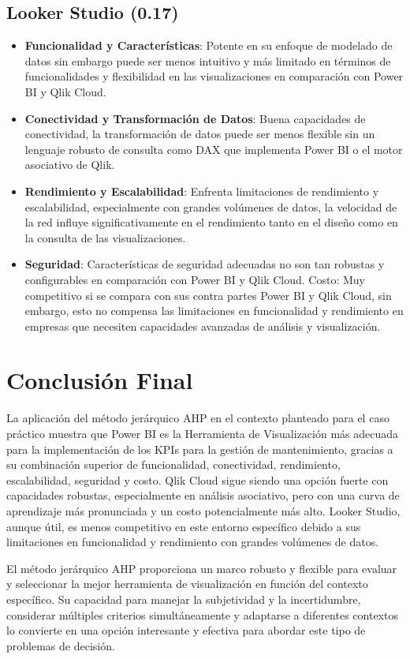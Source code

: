 \documentclass[
  11pt,
  bookmarksnumbered]{article}
\begin{document}
\hypertarget{looker-studio-0.17}{%
\subsection{Looker Studio (0.17)}\label{looker-studio-0.17}}

\begin{itemize}
\item
  \textbf{Funcionalidad y Características}: Potente en su enfoque de modelado de datos sin embargo puede ser menos intuitivo y más limitado en términos de funcionalidades y flexibilidad en las visualizaciones en comparación con Power BI y Qlik Cloud.
\item
  \textbf{Conectividad y Transformación de Datos}: Buena capacidades de conectividad, la transformación de datos puede ser menos flexible sin un lenguaje robusto de consulta como DAX que implementa Power BI o el motor asociativo de Qlik.
\item
  \textbf{Rendimiento y Escalabilidad}: Enfrenta limitaciones de rendimiento y escalabilidad, especialmente con grandes volúmenes de datos, la velocidad de la red influye significativamente en el rendimiento tanto en el diseño como en la consulta de las visualizaciones.
\item
  \textbf{Seguridad}: Características de seguridad adecuadas no son tan robustas y configurables en comparación con Power BI y Qlik Cloud.
  Costo: Muy competitivo si se compara con sus contra partes Power BI y Qlik Cloud, sin embargo, esto no compensa las limitaciones en funcionalidad y rendimiento en empresas que necesiten capacidades avanzadas de análisis y visualización.
\end{itemize}

\hypertarget{conclusiuxf3n-final}{%
\section{Conclusión Final}\label{conclusiuxf3n-final}}

La aplicación del método jerárquico AHP en el contexto planteado para el caso práctico muestra que Power BI es la Herramienta de Visualización más adecuada para la implementación de los KPIs para la gestión de mantenimiento, gracias a su combinación superior de funcionalidad, conectividad, rendimiento, escalabilidad, seguridad y costo. Qlik Cloud sigue siendo una opción fuerte con capacidades robustas, especialmente en análisis asociativo, pero con una curva de aprendizaje más pronunciada y un costo potencialmente más alto. Looker Studio, aunque útil, es menos competitivo en este entorno específico debido a sus limitaciones en funcionalidad y rendimiento con grandes volúmenes de datos.

El método jerárquico AHP proporciona un marco robusto y flexible para evaluar y seleccionar la mejor herramienta de visualización en función del contexto específico. Su capacidad para manejar la subjetividad y la incertidumbre, considerar múltiples criterios simultáneamente y adaptarse a diferentes contextos lo convierte en una opción interesante y efectiva para abordar este tipo de problemas de decisión.

\printbibliography
\end{document}
